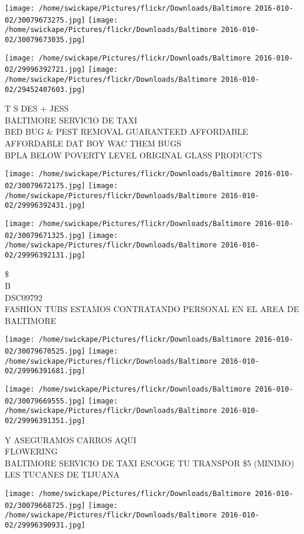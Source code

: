 \documentclass[10pt,letterpaper]{article}
\begin{document}
\texttt{[image: /home/swickape/Pictures/flickr/Downloads/Baltimore 2016-010-02/30079673275.jpg]}
\texttt{[image: /home/swickape/Pictures/flickr/Downloads/Baltimore 2016-010-02/30079673035.jpg]}

\texttt{[image: /home/swickape/Pictures/flickr/Downloads/Baltimore 2016-010-02/29996392721.jpg]}
\texttt{[image: /home/swickape/Pictures/flickr/Downloads/Baltimore 2016-010-02/29452407603.jpg]}

T S DES + JESS\\
BALTIMORE SERVICIO DE TAXI\\
BED BUG \& PEST REMOVAL GUARANTEED AFFORDABLE AFFORDABLE DAT BOY WAC THEM BUGS\\
BPLA BELOW POVERTY LEVEL ORIGINAL GLASS PRODUCTS
\pagebreak

\texttt{[image: /home/swickape/Pictures/flickr/Downloads/Baltimore 2016-010-02/30079672175.jpg]}
\texttt{[image: /home/swickape/Pictures/flickr/Downloads/Baltimore 2016-010-02/29996392431.jpg]}

\texttt{[image: /home/swickape/Pictures/flickr/Downloads/Baltimore 2016-010-02/30079671325.jpg]}
\texttt{[image: /home/swickape/Pictures/flickr/Downloads/Baltimore 2016-010-02/29996392131.jpg]}

\$\\
B\\
DSC09792\\
FASHION TUBS ESTAMOS CONTRATANDO PERSONAL EN EL AREA DE BALTIMORE
\pagebreak

\texttt{[image: /home/swickape/Pictures/flickr/Downloads/Baltimore 2016-010-02/30079670525.jpg]}
\texttt{[image: /home/swickape/Pictures/flickr/Downloads/Baltimore 2016-010-02/29996391681.jpg]}

\texttt{[image: /home/swickape/Pictures/flickr/Downloads/Baltimore 2016-010-02/30079669555.jpg]}
\texttt{[image: /home/swickape/Pictures/flickr/Downloads/Baltimore 2016-010-02/29996391351.jpg]}

Y ASEGURAMOS CARROS AQUI\\
FLOWERING\\
BALTIMORE SERVICIO DE TAXI ESCOGE TU TRANSPOR \$5 (MINIMO)\\
LES TUCANES DE TIJUANA
\pagebreak

\texttt{[image: /home/swickape/Pictures/flickr/Downloads/Baltimore 2016-010-02/30079668725.jpg]}
\texttt{[image: /home/swickape/Pictures/flickr/Downloads/Baltimore 2016-010-02/29996390931.jpg]}
\end{document}
